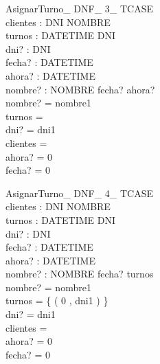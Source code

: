 \documentclass[%
  fleqn,colorlinks,linkcolor=blue,citecolor=blue,urlcolor=blue]{eptcs}
\begin{document}
\begin{schema}{AsignarTurno\_ DNF\_ 3\_ TCASE}\\
 clientes : DNI \pfun NOMBRE \\
 turnos : DATETIME \pfun DNI \\
 dni? : DNI \\
 fecha? : DATETIME \\
 ahora? : DATETIME \\
 nombre? : NOMBRE
\where
 fecha? \leq ahora? \\
 nombre? = nombre1 \\
 turnos =~\emptyset \\
 dni? = dni1 \\
 clientes =~\emptyset \\
 ahora? = 0 \\
 fecha? = 0
\end{schema}


\begin{schema}{AsignarTurno\_ DNF\_ 4\_ TCASE}\\
 clientes : DNI \pfun NOMBRE \\
 turnos : DATETIME \pfun DNI \\
 dni? : DNI \\
 fecha? : DATETIME \\
 ahora? : DATETIME \\
 nombre? : NOMBRE
\where
 fecha? \in \dom turnos \\
 nombre? = nombre1 \\
 turnos = \{ ( 0 , dni1 ) \} \\
 dni? = dni1 \\
 clientes =~\emptyset \\
 ahora? = 0 \\
 fecha? = 0
\end{schema}
\end{document}
